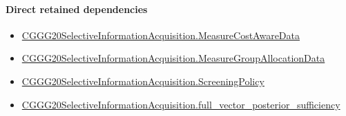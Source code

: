 \documentclass[10pt]{article}
\begin{document}
\paragraph{Direct retained dependencies}
\begin{itemize}\raggedright
\item \hyperlink{governing-declaration-254893ae2d19bfc7}{CGGG20\allowbreak{}Selective\allowbreak{}Information\allowbreak{}Acquisition.\allowbreak{}Measure\allowbreak{}Cost\allowbreak{}Aware\allowbreak{}Data}
\item \hyperlink{governing-declaration-da82fc25816f69f3}{CGGG20\allowbreak{}Selective\allowbreak{}Information\allowbreak{}Acquisition.\allowbreak{}Measure\allowbreak{}Group\allowbreak{}Allocation\allowbreak{}Data}
\item \hyperlink{paper-prerequisite-88f67c493873ffe9}{CGGG20\allowbreak{}Selective\allowbreak{}Information\allowbreak{}Acquisition.\allowbreak{}Screening\allowbreak{}Policy}
\item \hyperlink{governing-declaration-38fd6fc672d8bd2c}{CGGG20\allowbreak{}Selective\allowbreak{}Information\allowbreak{}Acquisition.\allowbreak{}full\_\allowbreak{}vector\_\allowbreak{}posterior\_\allowbreak{}sufficiency}
\end{itemize}
\end{document}
